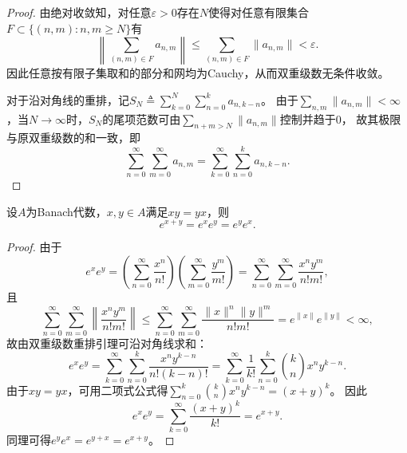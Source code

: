 \documentclass[lang=cn,a4paper,newtx,section]{elegantbook}
\begin{document}
\begin{proof}
  由绝对收敛知，对任意$\varepsilon > 0$存在$N$使得对任意有限集合$F \subset \{(n,m): n,m \geq N\}$有
  \begin{equation*}
    \left\|\sum_{(n,m)\in F} a_{n,m}\right\| \leq \sum_{(n,m)\in F}\|a_{n,m}\| < \varepsilon.
  \end{equation*}
  因此任意按有限子集取和的部分和网均为Cauchy，从而双重级数无条件收敛。
  
  对于沿对角线的重排，记$S_N \triangleq \sum_{k=0}^N \sum_{n=0}^k a_{n,k-n}$。
  由于$\sum_{n,m}\|a_{n,m}\|<\infty$，当$N\to\infty$时，$S_N$的尾项范数可由$\sum_{n+m>N}\|a_{n,m}\|$控制并趋于$0$，
  故其极限与原双重级数的和一致，即
  \begin{equation*}
    \sum_{n=0}^\infty \sum_{m=0}^\infty a_{n,m}
    = \sum_{k=0}^\infty \sum_{n=0}^k a_{n,k-n}.
  \end{equation*}
\end{proof}

\begin{proposition}
  设$A$为Banach代数，$x,y \in A$满足$xy=yx$，则
  \begin{equation*}
    e^{x+y} = e^x e^y = e^y e^x.
  \end{equation*}
\end{proposition}

\begin{proof}
  由于
  \begin{equation*}
    e^x e^y = \left(\sum_{n=0}^\infty \frac{x^n}{n!}\right)\left(\sum_{m=0}^\infty \frac{y^m}{m!}\right)
    = \sum_{n=0}^\infty\sum_{m=0}^\infty \frac{x^n y^m}{n!m!},
  \end{equation*}
  且
  \begin{equation*}
    \sum_{n=0}^\infty\sum_{m=0}^\infty \left\|\frac{x^n y^m}{n!m!}\right\|
    \leq \sum_{n=0}^\infty\sum_{m=0}^\infty \frac{\|x\|^n\|y\|^m}{n!m!}
    = e^{\|x\|}e^{\|y\|} < \infty,
  \end{equation*}
  故由双重级数重排引理可沿对角线求和：
  \begin{equation*}
    e^x e^y
    = \sum_{k=0}^\infty \sum_{n=0}^k \frac{x^n y^{k-n}}{n!(k-n)!}
    = \sum_{k=0}^\infty \frac{1}{k!}\sum_{n=0}^k \binom{k}{n} x^n y^{k-n}.
  \end{equation*}
  由于$xy=yx$，可用二项式公式得$\sum_{n=0}^k \binom{k}{n} x^n y^{k-n} = (x+y)^k$。
  因此
  \begin{equation*}
    e^x e^y
    = \sum_{k=0}^\infty \frac{(x+y)^k}{k!}
    = e^{x+y}.
  \end{equation*}
  同理可得$e^y e^x = e^{y+x} = e^{x+y}$。
\end{proof}
\end{document}
